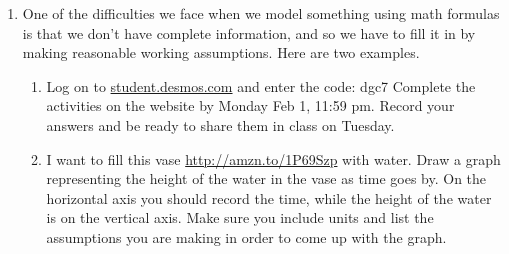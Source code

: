 \documentclass[11pt,dvipsnames]{article}
\begin{document}
\begin{enumerate}[label=$\blacktriangleright$ {\bf  \arabic*:}]
\item One of the difficulties we face when we model something using math formulas is that we don't have complete information, and so we have to fill it in by making reasonable working assumptions. Here are two examples.




\begin{enumerate}[label=$\blacktriangleright$ {\bf  \Alph*:}] 
	\item Log on to \url{student.desmos.com} and enter the code: dgc7
	\smallskip Complete the activities on the website by Monday Feb 1, 11:59 pm. Record your answers and be ready to share them in class on Tuesday.
	\item I want to fill this vase \url{http://amzn.to/1P69Szp} with water. Draw a graph representing the height of the water in the vase as time goes by. On the horizontal axis you should record the time, while the height of the water is on the vertical axis. Make sure you include units and list the assumptions you are making in order to come up with the graph.
\end{enumerate}
\end{enumerate}	
\end{document}
